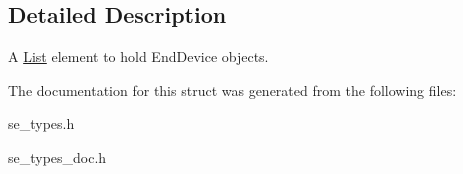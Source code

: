 \subsection{Detailed Description}
A \hyperlink{structList}{List} element to hold End\+Device objects. 

The documentation for this struct was generated from the following files\+:\begin{DoxyCompactItemize}
\item 
se\+\_\+types.\+h\item 
se\+\_\+types\+\_\+doc.\+h\end{DoxyCompactItemize}
